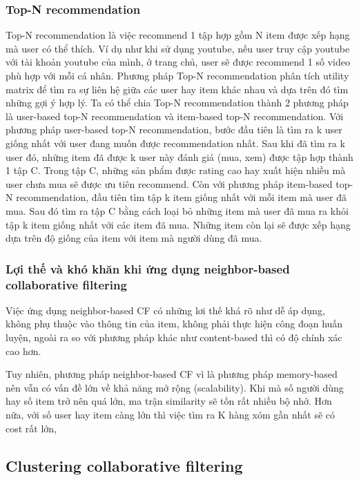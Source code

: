 \subsubsection{Top-N recommendation}
Top-N recommendation là việc recommend 1 tập hợp gồm N item được xếp hạng mà user có thể thích. Ví dụ như khi sử dụng youtube, nếu user truy cập youtube với tài khoản youtube của mình, ở trang chủ, user sẽ được recommend 1 số video phù hợp với mỗi cá nhân. Phương pháp Top-N recommendation phân tích utility matrix để tìm ra sự liên hệ giữa các user hay item khác nhau và dựa trên đó tìm những gợi ý hợp lý. Ta có thể chia Top-N recommendation thành 2 phương pháp là user-based top-N recommendation và item-based top-N recommendation.
\newline Với phương pháp user-based top-N recommendation, bước đầu tiên là tìm ra k user giống nhất với user đang muốn được recommendation nhất. Sau khi đã tìm ra k user đó, những item đã được k user này đánh giá (mua, xem) được tập hợp thành 1 tập C. Trong tập C, những sản phẩm được rating cao hay xuất hiện nhiều mà user chưa mua sẽ được ưu tiên recommend.
\newline Còn với phương pháp item-based top-N recommendation, đầu tiên tìm tập k item giống nhất với mỗi item mà user đã mua. Sau đó tìm ra tập C bằng cách loại bỏ những item mà user đã mua ra khỏi tập k item giống nhất với các item đã mua. Những item còn lại sẽ được xếp hạng dựa trên độ giống của item với item mà người dùng đã mua.

\subsubsection{Lợi thế và khó khăn khi ứng dụng neighbor-based collaborative filtering}
Việc ứng dụng neighbor-based CF có những lơi thế khá rõ như dễ áp dụng, không phụ thuộc vào thông tin của item, không phải thực hiện công đoạn huấn luyện, ngoài ra so với phương pháp khác như content-based thì có độ chính xác cao hơn.

Tuy nhiên, phương pháp neighbor-based CF vì là phương pháp memory-based nên vẫn có vấn đề lớn về khả năng mở rộng (scalability). Khi mà số người dùng hay số item trở nên quá lớn, ma trận similarity sẽ tốn rất nhiều bộ nhớ. Hơn nữa, với số user hay item càng lớn thì việc tìm ra K hàng xóm gần nhất sẽ có cost rất lớn,

\subsection{Clustering collaborative filtering}
